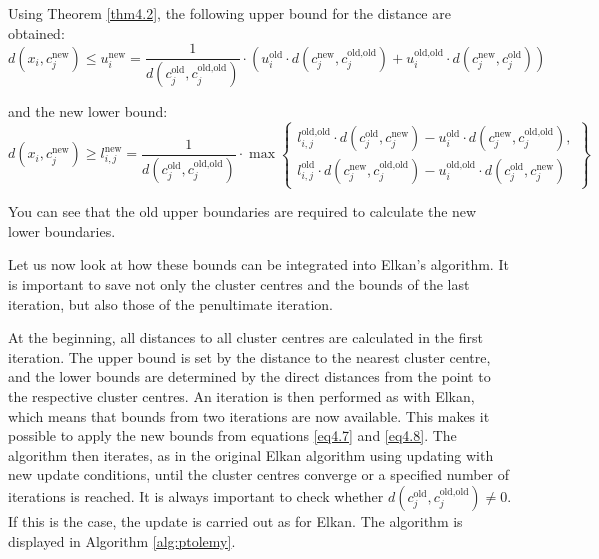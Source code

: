Using Theorem \ref{thm4.2}, the following upper bound for the distance are obtained:
\begin{equation}
	\label{eq4.7}
	d(x_i, c_j^{\text{new}}) \leq u_i^{\text{new}} = \frac{1}{d(c_j^{\text{old}}, c_j^{\text{old,old}})} \cdot \left( u_i^{\text{old}} \cdot d(c_j^{\text{new}}, c_j^{\text{old,old}}) + u_i^{\text{old,old}} \cdot d(c_j^{\text{new}}, c_j^{\text{old}}) \right)
\end{equation}

and the new lower bound:
\begin{equation}
	\label{eq4.8}
	d(x_i, c_j^{\text{new}}) \geq l_{i,j}^{\text{new}} = \frac{1}{d(c_j^{\text{old}}, c_j^{\text{old,old}})} \cdot \max \left\{
	\begin{array}{l}
		l_{i,j}^{\text{old,old}} \cdot d(c_j^{\text{old}}, c_j^{\text{new}}) - u_i^{\text{old}} \cdot d(c_j^{\text{new}}, c_j^{\text{old,old}}), \\
		l_{i,j}^{\text{old}} \cdot d(c_j^{\text{new}}, c_j^{\text{old,old}}) - u_i^{\text{old,old}} \cdot d(c_j^{\text{old}}, c_j^{\text{new}})
	\end{array}
	\right\}
\end{equation}

You can see that the old upper boundaries are required to calculate the new lower boundaries.

Let us now look at how these bounds can be integrated into Elkan's algorithm. It is important to save not only the cluster centres and the bounds of the last iteration, but also those of the penultimate iteration.

At the beginning, all distances to all cluster centres are calculated in the first iteration. The upper bound is set by the distance to the nearest cluster centre, and the lower bounds are determined by the direct distances from the point to the respective cluster centres. An iteration is then performed as with Elkan, which means that bounds from two iterations are now available. This makes it possible to apply the new bounds from equations \ref{eq4.7} and \ref{eq4.8}. The algorithm then iterates, as in the original Elkan algorithm using updating with new update conditions, until the cluster centres converge or a specified number of iterations is reached. It is always important to check whether $d(c_j^{\text{old}}, c_j^{\text{old,old}}) \neq 0$. If this is the case, the update is carried out as for Elkan. The algorithm is displayed in Algorithm \ref{alg:ptolemy}.




